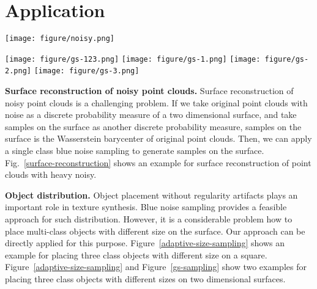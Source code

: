 \section{Application}

\begin{figure*}[htb]
  \centering

  \texttt{[image: figure/noisy.png]}
  \caption{Surface reconstruction of noisy point clouds.
  (a) is original point clouds with $8856$ points.
  (c) is mesh reconstruction result on $3946$ sampling points.
  (b) is rendering result with point clouds (a) and mesh model (c).
  (d) is the close-up view of (c) at the square mark.
   }\label{surface-reconstruction}
\end{figure*}

\begin{figure*}[htb]
  \centering
   \begin{minipage}{1\textwidth}
  \texttt{[image: figure/gs-123.png]}
  \texttt{[image: figure/gs-1.png]}
  \texttt{[image: figure/gs-2.png]}
  \texttt{[image: figure/gs-3.png]}
  \end{minipage}
  \caption{Object placement on a complex geometry model.
  The number of samples of each class is $200$, $1000$ and $1000$.}\label{gs-sampling}
\end{figure*}


\textbf{Surface reconstruction of noisy point clouds.}
Surface reconstruction of noisy point clouds is a challenging problem.
If we take original point clouds with noise as a discrete probability measure of a two dimensional surface,
and take samples on the surface as another discrete probability measure,
samples on the surface is the Wasserstein barycenter of original point clouds.
Then,
we can apply a single class blue noise sampling to generate samples on the surface.
Fig.~\ref{surface-reconstruction} shows an example for surface reconstruction of point clouds with heavy noisy.

\textbf{Object distribution.}
Object placement without regularity artifacts plays an important role in texture synthesis.
Blue noise sampling provides a feasible approach for such distribution.
However,
it is a considerable problem how to place multi-class objects with different size on the surface.
Our approach can be directly applied for this purpose.
Figure~\ref{adaptive-size-sampling} shows an example for placing three class objects with different size on a square.
Figure~\ref{adaptive-size-sampling} and Figure~\ref{gs-sampling} show two examples for placing three class objects with different sizes on two dimensional surfaces.


